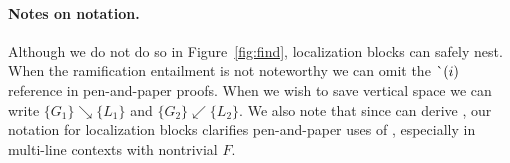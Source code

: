 \paragraph{Notes on notation.} Although we do not do so in Figure~\ref{fig:find}, localization blocks can safely nest.  When the ramification entailment is not noteworthy we can omit the $\lightning(i)$ reference in pen-and-paper proofs.  When we wish to save vertical space we can write $\{ G_1 \} \searrow \{ L_1 \}$ and $\{ G_2 \} \swarrow \{ L_2 \}$.
We also note that since  can derive , our notation for localization blocks clarifies pen-and-paper uses of , especially in multi-line contexts with nontrivial $F$.

